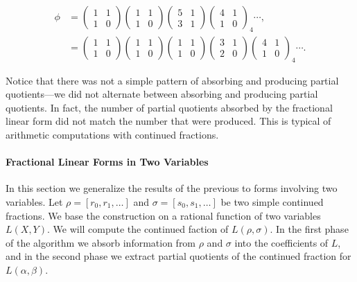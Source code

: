 \[
\begin{aligned}
  \phi &= \begin{pmatrix}1 & 1\\ 1 & 0 \end{pmatrix} \begin{pmatrix}1 & 1\\ 1 & 0 \end{pmatrix}
   \begin{pmatrix}5 & 1\\ 3 & 1\end{pmatrix}
   \begin{pmatrix}4 & 1 \\ 1 & 0 \end{pmatrix}_4 \cdots, \\
   &= \begin{pmatrix}1 & 1\\ 1 & 0 \end{pmatrix} \begin{pmatrix}1 & 1\\ 1 & 0 \end{pmatrix}
      \begin{pmatrix}1 & 1\\ 1 & 0 \end{pmatrix} \begin{pmatrix}3 & 1\\ 2 & 0 \end{pmatrix}
   \begin{pmatrix}4 & 1 \\ 1 & 0 \end{pmatrix}_4 \cdots.
\end{aligned}
\]

Notice that there was not a simple pattern of absorbing and producing
partial quotients---we did not alternate between absorbing and
producing partial quotients.  In fact, the number of partial quotients
absorbed by the fractional linear form did not match the number that
were produced.  This is typical of arithmetic computations with
continued fractions.


\paragraph{Fractional Linear Forms in Two Variables}

In this section we generalize the results of the previous to forms
involving two variables.  Let $\rho = [r_0, r_1, \ldots]$ and $\sigma
= [s_0, s_1, \ldots]$ be two simple continued fractions.  We base the
construction on a rational function of two variables $L(X, Y)$.  We
will compute the continued faction of $L(\rho, \sigma)$. In the first
phase of the algorithm we absorb information from $\rho$ and $\sigma$
into the coefficients of $L$, and in the second phase we extract
partial quotients of the continued fraction for $L(\alpha,\beta)$.

